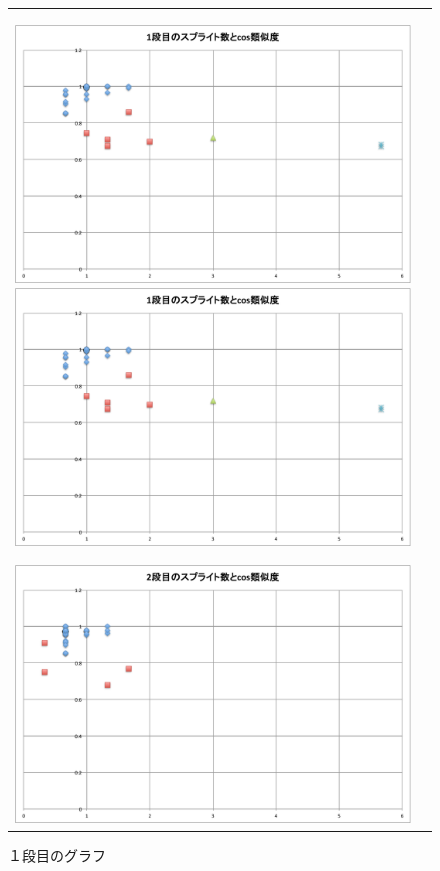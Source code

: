 \documentclass[a4paper,10pt,onecolumn,oneside,openany]{jsbook}
\begin{document}
\begin{figure}[h]
 \begin{tabular}{cc}
 	\begin{minipage}[t]{0.45\hsize}
	 \centering
	 \includegraphics[keepaspectratio, scale = 0.26]{mazegame_first_splite.pdf}
	 \includegraphics[keepaspectratio, scale = 0.25]{mazegame_first_splite.pdf}
	 \caption{１段目のグラフ}
	 \label{mazegame_first_splite_cos}
	\end{minipage}
        \begin{minipage}[t]{0.45\hsize}
	 \centering
	 \includegraphics[keepaspectratio, scale = 0.26]{mazegame_second_splite.pdf}

\end{minipage}
\end{tabular}
\end{figure}
\end{document}
